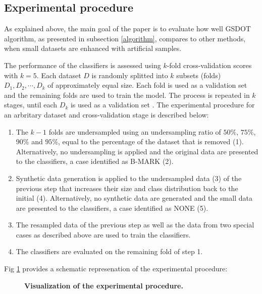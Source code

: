 \documentclass[10pt,letterpaper]{article}
\begin{document}
\subsection{Experimental procedure}
\label{experimental}

As explained above, the main goal of the paper is to evaluate how well GSDOT algorithm, as presented in subsection \ref{algorithm}, compares to other methods, when small datasets are enhanced with artificial samples.

The performance of the classifiers is assessed using \(k \)-fold cross-validation scores with \( k = 5 \). Each dataset \( D \) is randomly splitted into \( k \) subsets (folds) \( D_1, D_2, \cdots, D_k \) of approximately equal size. Each fold is used as a validation set and the remaining folds are used to train the model. The process is repeated in \( k \) stages, until each \( D_k \) is used as a validation set \cite{Han.2012}. The experimental procedure for an arbritary dataset and cross-validation stage is described below:

\begin{enumerate}

	\item The \( k - 1 \) folds are undersampled using an undersampling ratio
	of $50\%$, $75\%$, $90\%$ and $95\%$, equal to the percentage of the dataset that is removed (1). Alternatively, no undersampling is applied and the original data are presented to the classifiers, a case identified as B-MARK (2).

	\item Synthetic data generation is applied to the undersampled data (3) of the previous
	step that increases their size and class distribution back to the initial (4). Alternatively, no synthetic data are generated and the small data are presented to the classifiers, a case identified as NONE (5).

	\item The resampled data of the previous step as well as the data from two special cases as described above are used to train the classifiers.
	
	\item The classifiers are evaluated on the remaining fold of step 1.

\end{enumerate}

 Fig \ref{fig:experimentalprocedure} provides a schematic represenation of the experimental procedure: 

 \begin{figure}[!h]
	\centering
	\caption{\bf Visualization of the experimental procedure.}
	\label{fig:experimentalprocedure}
\end{figure}
\end{document}
